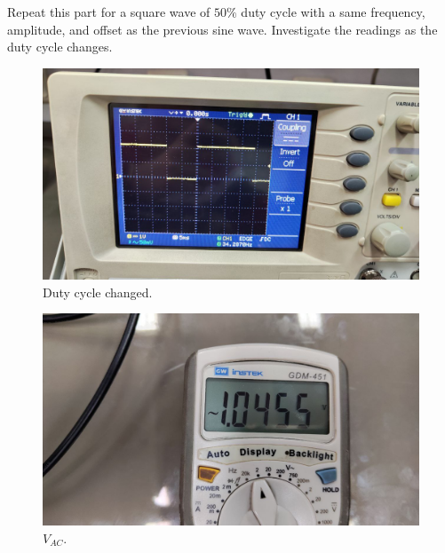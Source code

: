 \documentclass[11pt]{article}
\newcommand{\PicScale}{0.2}
\begin{document}
\begin{question}
\begin{subquestion}{Repeat this part for a square wave of $50\%$ duty cycle with a same frequency, amplitude, and offset as the previous sine wave. Investigate the readings as the duty cycle changes.}
{    \begin{figure}[H]
        \begin{center}
            \includegraphics[scale=\PicScale]{Fig/33.jpeg}
            \caption{Duty cycle changed.}
        \end{center}
    \end{figure}
    \begin{figure}[H]
        \begin{center}
            \includegraphics[scale=\PicScale]{Fig/34.jpeg}
            \caption{$V_{AC}$.}
        \end{center}
    \end{figure}

}
\end{subquestion}
\end{question}
\end{document}
